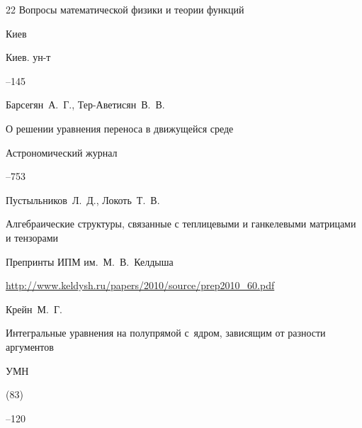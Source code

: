 \begin{thebibliography}{22}
\inbook Вопросы математической физики и теории функций

\publaddr Киев 

\publ Киев. ун-т


--145





\by Барсегян~А.~Г., Тер-Аветисян~В.~В.

\paper О решении уравнения переноса в движущейся среде

\jour Астрономический журнал




--753








\by Пустыльников~Л.~Д.,  Локоть~Т.~В.

\paper Алгебраические структуры, связанные с теплицевыми и ганкелевыми матрицами и тензорами

\jour Препринты ИПМ им.~М.~В.~Келдыша





\elink \url{http://www.keldysh.ru/papers/2010/source/prep2010_60.pdf}




\by Крейн~М.~Г.

\paper Интегральные уравнения на полупрямой с~ядром, зависящим от разности аргументов

\jour УМН



(83)

--120




\end{thebibliography}
